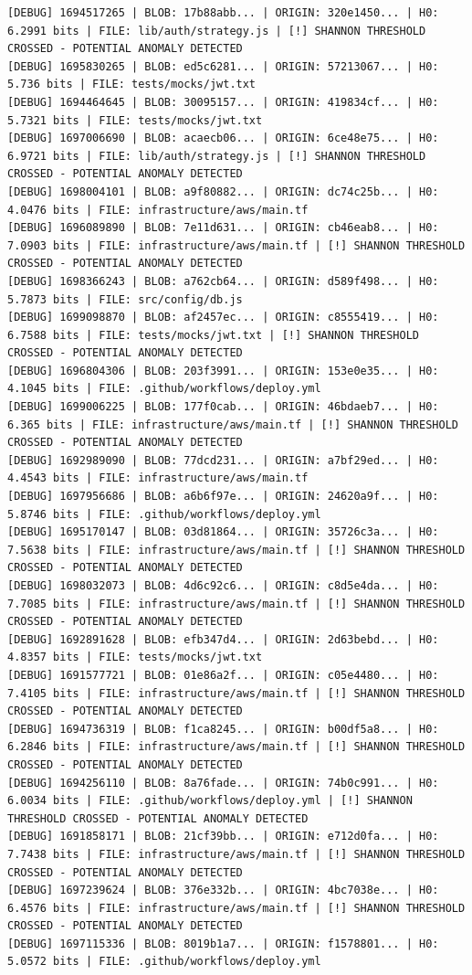 \documentclass[12pt, a4paper, oneside]{report}
\begin{document}
\begin{lstlisting}[basicstyle=\tiny\ttfamily]
[DEBUG] 1694517265 | BLOB: 17b88abb... | ORIGIN: 320e1450... | H0: 6.2991 bits | FILE: lib/auth/strategy.js | [!] SHANNON THRESHOLD CROSSED - POTENTIAL ANOMALY DETECTED
[DEBUG] 1695830265 | BLOB: ed5c6281... | ORIGIN: 57213067... | H0: 5.736 bits | FILE: tests/mocks/jwt.txt
[DEBUG] 1694464645 | BLOB: 30095157... | ORIGIN: 419834cf... | H0: 5.7321 bits | FILE: tests/mocks/jwt.txt
[DEBUG] 1697006690 | BLOB: acaecb06... | ORIGIN: 6ce48e75... | H0: 6.9721 bits | FILE: lib/auth/strategy.js | [!] SHANNON THRESHOLD CROSSED - POTENTIAL ANOMALY DETECTED
[DEBUG] 1698004101 | BLOB: a9f80882... | ORIGIN: dc74c25b... | H0: 4.0476 bits | FILE: infrastructure/aws/main.tf
[DEBUG] 1696089890 | BLOB: 7e11d631... | ORIGIN: cb46eab8... | H0: 7.0903 bits | FILE: infrastructure/aws/main.tf | [!] SHANNON THRESHOLD CROSSED - POTENTIAL ANOMALY DETECTED
[DEBUG] 1698366243 | BLOB: a762cb64... | ORIGIN: d589f498... | H0: 5.7873 bits | FILE: src/config/db.js
[DEBUG] 1699098870 | BLOB: af2457ec... | ORIGIN: c8555419... | H0: 6.7588 bits | FILE: tests/mocks/jwt.txt | [!] SHANNON THRESHOLD CROSSED - POTENTIAL ANOMALY DETECTED
[DEBUG] 1696804306 | BLOB: 203f3991... | ORIGIN: 153e0e35... | H0: 4.1045 bits | FILE: .github/workflows/deploy.yml
[DEBUG] 1699006225 | BLOB: 177f0cab... | ORIGIN: 46bdaeb7... | H0: 6.365 bits | FILE: infrastructure/aws/main.tf | [!] SHANNON THRESHOLD CROSSED - POTENTIAL ANOMALY DETECTED
[DEBUG] 1692989090 | BLOB: 77dcd231... | ORIGIN: a7bf29ed... | H0: 4.4543 bits | FILE: infrastructure/aws/main.tf
[DEBUG] 1697956686 | BLOB: a6b6f97e... | ORIGIN: 24620a9f... | H0: 5.8746 bits | FILE: .github/workflows/deploy.yml
[DEBUG] 1695170147 | BLOB: 03d81864... | ORIGIN: 35726c3a... | H0: 7.5638 bits | FILE: infrastructure/aws/main.tf | [!] SHANNON THRESHOLD CROSSED - POTENTIAL ANOMALY DETECTED
[DEBUG] 1698032073 | BLOB: 4d6c92c6... | ORIGIN: c8d5e4da... | H0: 7.7085 bits | FILE: infrastructure/aws/main.tf | [!] SHANNON THRESHOLD CROSSED - POTENTIAL ANOMALY DETECTED
[DEBUG] 1692891628 | BLOB: efb347d4... | ORIGIN: 2d63bebd... | H0: 4.8357 bits | FILE: tests/mocks/jwt.txt
[DEBUG] 1691577721 | BLOB: 01e86a2f... | ORIGIN: c05e4480... | H0: 7.4105 bits | FILE: infrastructure/aws/main.tf | [!] SHANNON THRESHOLD CROSSED - POTENTIAL ANOMALY DETECTED
[DEBUG] 1694736319 | BLOB: f1ca8245... | ORIGIN: b00df5a8... | H0: 6.2846 bits | FILE: infrastructure/aws/main.tf | [!] SHANNON THRESHOLD CROSSED - POTENTIAL ANOMALY DETECTED
[DEBUG] 1694256110 | BLOB: 8a76fade... | ORIGIN: 74b0c991... | H0: 6.0034 bits | FILE: .github/workflows/deploy.yml | [!] SHANNON THRESHOLD CROSSED - POTENTIAL ANOMALY DETECTED
[DEBUG] 1691858171 | BLOB: 21cf39bb... | ORIGIN: e712d0fa... | H0: 7.7438 bits | FILE: infrastructure/aws/main.tf | [!] SHANNON THRESHOLD CROSSED - POTENTIAL ANOMALY DETECTED
[DEBUG] 1697239624 | BLOB: 376e332b... | ORIGIN: 4bc7038e... | H0: 6.4576 bits | FILE: infrastructure/aws/main.tf | [!] SHANNON THRESHOLD CROSSED - POTENTIAL ANOMALY DETECTED
[DEBUG] 1697115336 | BLOB: 8019b1a7... | ORIGIN: f1578801... | H0: 5.0572 bits | FILE: .github/workflows/deploy.yml
\end{lstlisting}
\end{document}
